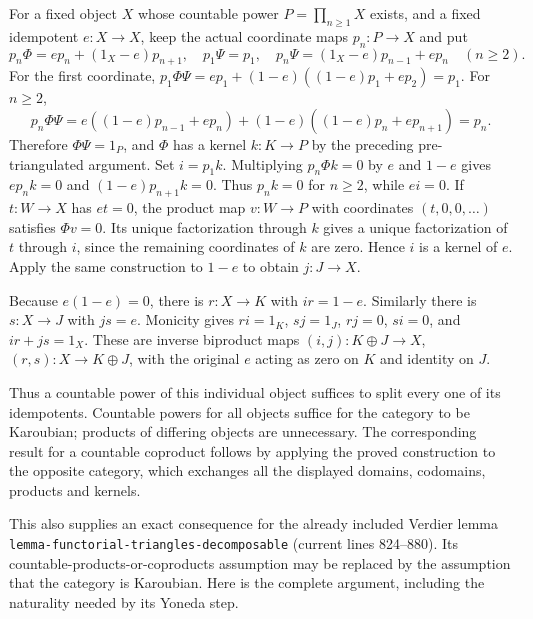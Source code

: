 \documentclass[11pt]{article}
\begin{document}
For a fixed object \(X\) whose countable power \(P=\prod_{n\ge1}X\) exists,\allowbreak{} and a fixed idempotent \(e:X\to X\),\allowbreak{} keep the actual coordinate maps \(p_n:P\to X\) and put \[
p_n\Phi=e p_n+(1_X-e)p_{n+1},\quad
p_1\Psi=p_1,\quad
p_n\Psi=(1_X-e)p_{n-1}+e p_n\quad(n\ge2).
\] For the first coordinate,\allowbreak{} \(p_1\Phi\Psi=e p_1+(1-e)((1-e)p_1+e p_2)=p_1\). For \(n\ge2\),\allowbreak{} \[
p_n\Phi\Psi=e((1-e)p_{n-1}+e p_n)
 +(1-e)((1-e)p_n+e p_{n+1})=p_n.
\] Therefore \(\Phi\Psi=1_P\),\allowbreak{} and \(\Phi\) has a kernel \(k:K\to P\) by the preceding pre-triangulated argument. Set \(i=p_1k\). Multiplying \(p_n\Phi k=0\) by \(e\) and \(1-e\) gives \(e p_nk=0\) and \((1-e)p_{n+1}k=0\). Thus \(p_nk=0\) for \(n\ge2\),\allowbreak{} while \(ei=0\). If \(t:W\to X\) has \(et=0\),\allowbreak{} the product map \(v:W\to P\) with coordinates \((t,0,0,\ldots)\) satisfies \(\Phi v=0\). Its unique factorization through \(k\) gives a unique factorization of \(t\) through \(i\),\allowbreak{} since the remaining coordinates of \(k\) are zero. Hence \(i\) is a kernel of \(e\). Apply the same construction to \(1-e\) to obtain \(j:J\to X\).

Because \(e(1-e)=0\),\allowbreak{} there is \(r:X\to K\) with \(ir=1-e\). Similarly there is \(s:X\to J\) with \(js=e\). Monicity gives \(ri=1_K\),\allowbreak{} \(sj=1_J\),\allowbreak{} \(rj=0\),\allowbreak{} \(si=0\),\allowbreak{} and \(ir+js=1_X\). These are inverse biproduct maps \((i,j):K\oplus J\to X\),\allowbreak{} \((r,s):X\to K\oplus J\),\allowbreak{} with the original \(e\) acting as zero on \(K\) and identity on \(J\).

Thus a countable power of this individual object suffices to split every one of its idempotents. Countable powers for all objects suffice for the category to be Karoubian; products of differing objects are unnecessary. The corresponding result for a countable coproduct follows by applying the proved construction to the opposite category,\allowbreak{} which exchanges all the displayed domains,\allowbreak{} codomains,\allowbreak{} products and kernels.

This also supplies an exact consequence for the already included Verdier lemma \texttt{lemma-\allowbreak{}functorial-\allowbreak{}triangles-\allowbreak{}decomposable} (current lines 824–\allowbreak{}880)\allowbreak{}. Its countable-products-or-coproducts assumption may be replaced by the assumption that the category is Karoubian. Here is the complete argument,\allowbreak{} including the naturality needed by its Yoneda step.
\end{document}
